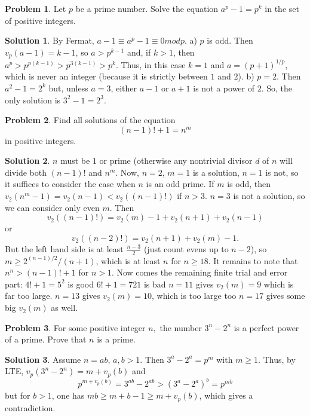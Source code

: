 \documentclass{article}
\theoremstyle{definition}
\newtheorem{problem}{Problem}
\newtheorem*{solution}{Solution}
\begin{document}
\begin{problem}
Let $p$ be a prime number. Solve the equation $a^p-1 = p^k$ in the set of positive integers.
\end{problem}

\begin{solution}
By Fermat, $a-1\equiv a^p-1\equiv 0 mod p$.
a) $p$ is odd. Then $v_p(a-1)=k-1$, so $a> p^{k-1}$ and, if $k>1$, then $a^p>p^{p(k-1)}>p^{3(k-1)}>p^k$. Thus, in this case $k=1$ and $a=(p+1)^{1/p}$, which is never an integer (because it is strictly between $1$ and $2$).
b) $p=2$. Then $a^2-1=2^k$ but, unless $a=3$, either $a-1$ or $a+1$ is not a power of $2$.
So, the only solution is $3^2-1=2^3$.
\end{solution}

\begin{problem}
Find all solutions of the equation
$$(n-1)! + 1 = n^m$$ in positive integers.
\end{problem}

\begin{solution}
$n$ must be $1$ or prime (otherwise any nontrivial divisor $d$ of $n$ will divide both $(n-1)!$ and $n^m$. Now, $n=2$, $m=1$ is a solution, $n=1$ is not, so it suffices to consider the case when $n$ is an odd prime.
If $m$ is odd, then $v_2(n^m-1)=v_2(n-1) < v_2((n-1)!)$ if $n > 3$. $n=3$ is not a solution, so we can consider only even $m$.
Then $$v_2((n-1)!)=v_2(m)-1+v_2(n+1)+v_2(n-1)$$ or $$v_2((n-2)!)=v_2(n+1)+v_2(m)-1.$$ But the left hand side is at least $\frac{n-3}{2}$ (just count evens up to $n-2$), so $m\ge 2^{(n-1)/2}/(n+1)$, which is at least $n$ for $n\ge 18$. It remains to note that $n^n > (n-1)!+1$ for $n>1$.
Now comes the remaining finite trial and error part:
$4!+1=5^2$ is good
$6!+1=721$ is bad
$n=11$ gives $v_2(m)=9$ which is far too large.
$n=13$ gives $v_2(m)=10$, which is too large too
$n=17$ gives some big $v_2(m)$ as well.
\end{solution}

\begin{problem}
For some positive integer $n,$ the number $3^n-2^n$ is a perfect power of a prime. Prove that $n$ is a prime.
\end{problem}

\begin{solution}
Assume $n=ab$, $a,b>1$. Then $3^a-2^a=p^m$ with $m\ge 1$. Thus, by LTE, $v_p(3^n-2^n)=m+v_p(b)$ and $$p^{m+v_p(b)}=3^{ab}-2^{ab}>(3^a-2^a)^b=p^{mb}$$ but for $b>1$, one has $mb\ge m+b-1\ge m+v_p(b)$, which gives a contradiction.
\end{solution}
\end{document}
